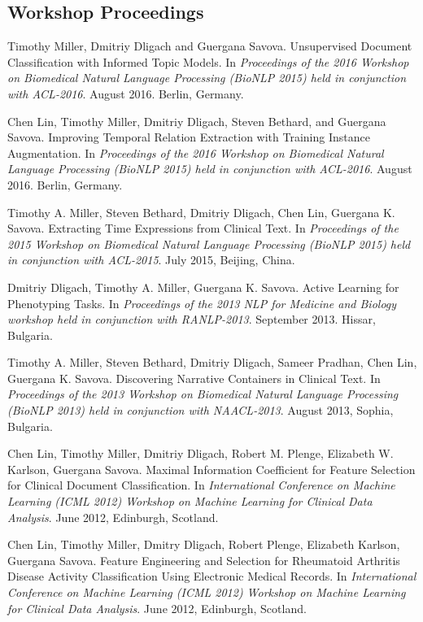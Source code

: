 \documentclass[letterpaper]{article}
\renewenvironment{itemize}{
  \begin{list}{}{
    \setlength{\leftmargin}{1.5em}
  }
}{
  \end{list}
}
\begin{document}
\subsection*{Workshop Proceedings}

\begin{itemize}

\item Timothy Miller, Dmitriy Dligach and Guergana Savova. Unsupervised Document Classification with Informed Topic Models. In \emph{Proceedings of the 2016 Workshop on Biomedical Natural Language Processing (BioNLP 2015) held in conjunction with ACL-2016}. August 2016. Berlin, Germany.
\item Chen Lin, Timothy Miller, Dmitriy Dligach, Steven Bethard, and Guergana Savova. Improving Temporal Relation Extraction with Training Instance Augmentation. In \emph{Proceedings of the 2016 Workshop on Biomedical Natural Language Processing (BioNLP 2015) held in conjunction with ACL-2016}. August 2016. Berlin, Germany.
\item Timothy A. Miller, Steven Bethard, Dmitriy Dligach, Chen Lin, Guergana K. Savova. Extracting Time Expressions from Clinical Text. In \emph{Proceedings of the 2015 Workshop on Biomedical Natural Language Processing (BioNLP 2015) held in conjunction with ACL-2015}. July 2015, Beijing, China.
\item Dmitriy Dligach, Timothy A. Miller, Guergana K. Savova. Active Learning for Phenotyping Tasks. In \emph{Proceedings of the 2013 NLP for Medicine and Biology workshop held in conjunction with RANLP-2013}. September 2013. Hissar, Bulgaria.
\item Timothy A. Miller, Steven Bethard, Dmitriy Dligach, Sameer Pradhan, Chen Lin, Guergana K. Savova. Discovering Narrative Containers in Clinical Text. In \emph{Proceedings of the 2013 Workshop on Biomedical Natural Language Processing (BioNLP 2013) held in conjunction with NAACL-2013}. August 2013, Sophia, Bulgaria.
\item Chen Lin, Timothy Miller, Dmitriy Dligach, Robert M. Plenge, Elizabeth W. Karlson, Guergana Savova. Maximal Information Coefficient for Feature Selection for Clinical Document Classification. In \emph{International Conference on Machine Learning (ICML 2012) Workshop on Machine Learning for Clinical Data Analysis}. June 2012, Edinburgh, Scotland. 
\item Chen Lin, Timothy Miller, Dmitry Dligach, Robert Plenge, Elizabeth Karlson, Guergana Savova. Feature Engineering and Selection for Rheumatoid Arthritis Disease Activity Classification Using Electronic Medical Records. In \emph{International Conference on Machine Learning (ICML 2012) Workshop on Machine Learning for Clinical Data Analysis}. June 2012, Edinburgh, Scotland. 

\end{itemize}
\end{document}
